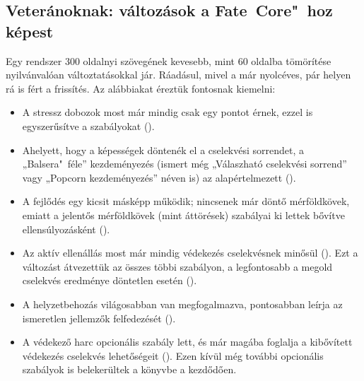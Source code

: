 \subsection{Veteránoknak: változások a Fate~Core"~hoz képest}

Egy rendszer 300 oldalnyi szövegének kevesebb, mint 60 oldalba tömörítése nyilvánvalóan változtatásokkal jár. Ráadásul, mivel a  már nyolcéves, pár helyen rá is fért a frissítés. Az alábbiakat éreztük fontosnak kiemelni:
\begin{itemize}
    \item A stressz dobozok most már mindig csak egy pontot érnek, ezzel is egyszerűsítve a szabályokat ().
    \item Ahelyett, hogy a képességek döntenék el a cselekvési sorrendet, a „Balsera"~féle” kezdeményezés (ismert még „Válaszható cselekvési sorrend” vagy „Popcorn kezdeményezés” néven is) az alapértelmezett ().
    \item A fejlődés egy kicsit másképp működik; nincsenek már döntő mérföldkövek, emiatt a jelentős mérföldkövek (mint áttörések) szabályai ki lettek bővítve ellensúlyozásként ().
    \item Az aktív ellenállás most már mindig védekezés cselekvésnek minősül (). Ezt a változást átvezettük az összes többi szabályon, a legfontosabb a megold cselekvés eredménye döntetlen esetén ().
    \item A helyzetbehozás világosabban van megfogalmazva, pontosabban leírja az ismeretlen jellemzők felfedezését ().
    \item A védekező harc opcionális szabály lett, és már magába foglalja a kibővített védekezés cselekvés lehetőségeit (). Ezen kívül még további opcionális szabályok is belekerültek a könyvbe a  kezdődően.
\end{itemize}
